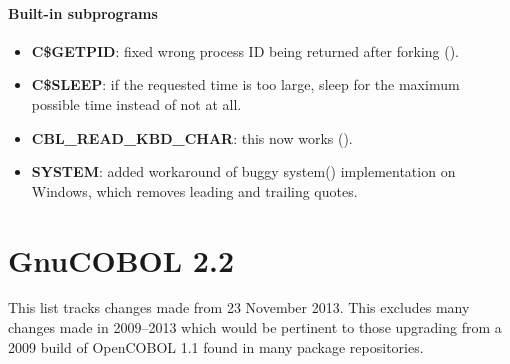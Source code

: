 \paragraph{Built-in subprograms}
\begin{itemize}
\item \textbf{C\$GETPID}: fixed wrong process ID being returned after forking ().
\item \textbf{C\$SLEEP}: if the requested time is too large, sleep for the maximum possible time instead of not at all.
\item \textbf{CBL\_READ\_KBD\_CHAR}: this now works ().
\item \textbf{SYSTEM}: added workaround of buggy system() implementation on Windows, which removes leading and trailing quotes.
\end{itemize}

\section{GnuCOBOL 2.2}

This list tracks changes made from 23 November 2013. This excludes many changes made in 2009--2013 which would be pertinent to those upgrading from a 2009 build of OpenCOBOL 1.1 found in many package repositories.

